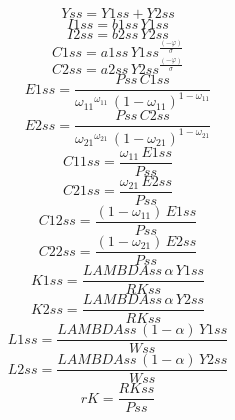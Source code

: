 \begin{dmath*}
Yss = {Y1ss}+{Y2ss}
\end{dmath*}
\begin{dmath*}
I1ss = {b1ss}\, {Y1ss}
\end{dmath*}
\begin{dmath*}
I2ss = {b2ss}\, {Y2ss}
\end{dmath*}
\begin{dmath*}
C1ss = {a1ss}\, {Y1ss}^{\frac{\left(-{{\varphi}}\right)}{{{\sigma}}}}
\end{dmath*}
\begin{dmath*}
C2ss = {a2ss}\, {Y2ss}^{\frac{\left(-{{\varphi}}\right)}{{{\sigma}}}}
\end{dmath*}
\begin{dmath*}
E1ss = \frac{{Pss}\, {C1ss}}{{{\omega_{11}}}^{{{\omega_{11}}}}\, \left(1-{{\omega_{11}}}\right)^{1-{{\omega_{11}}}}}
\end{dmath*}
\begin{dmath*}
E2ss = \frac{{Pss}\, {C2ss}}{{{\omega_{21}}}^{{{\omega_{21}}}}\, \left(1-{{\omega_{21}}}\right)^{1-{{\omega_{21}}}}}
\end{dmath*}
\begin{dmath*}
C11ss = \frac{{{\omega_{11}}}\, {E1ss}}{{Pss}}
\end{dmath*}
\begin{dmath*}
C21ss = \frac{{{\omega_{21}}}\, {E2ss}}{{Pss}}
\end{dmath*}
\begin{dmath*}
C12ss = \frac{\left(1-{{\omega_{11}}}\right)\, {E1ss}}{{Pss}}
\end{dmath*}
\begin{dmath*}
C22ss = \frac{\left(1-{{\omega_{21}}}\right)\, {E2ss}}{{Pss}}
\end{dmath*}
\begin{dmath*}
K1ss = \frac{{LAMBDAss}\, {{\alpha}}\, {Y1ss}}{{RKss}}
\end{dmath*}
\begin{dmath*}
K2ss = \frac{{LAMBDAss}\, {{\alpha}}\, {Y2ss}}{{RKss}}
\end{dmath*}
\begin{dmath*}
L1ss = \frac{{LAMBDAss}\, \left(1-{{\alpha}}\right)\, {Y1ss}}{{Wss}}
\end{dmath*}
\begin{dmath*}
L2ss = \frac{{LAMBDAss}\, \left(1-{{\alpha}}\right)\, {Y2ss}}{{Wss}}
\end{dmath*}
\begin{dmath*}
rK = \frac{{RKss}}{{Pss}}
\end{dmath*}
